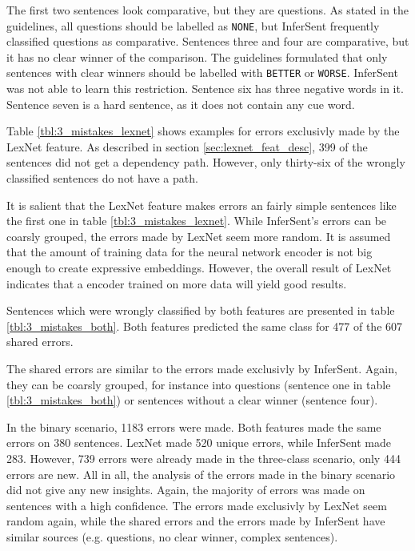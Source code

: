 The first two sentences look comparative, but they are questions. As stated in the guidelines, all questions should be labelled as \texttt{NONE}, but InferSent frequently classified questions as comparative. Sentences three and four are comparative, but it has no clear winner of the comparison. The guidelines formulated that only sentences with clear winners should be labelled with \texttt{BETTER} or \texttt{WORSE}. InferSent was not able to learn this restriction. Sentence six has three negative words in it. Sentence seven is a hard sentence, as it does not contain any cue word.

Table \ref{tbl:3_mistakes_lexnet} shows examples for errors exclusivly made by the LexNet feature. As described in section \ref{sec:lexnet_feat_desc}, 399 of the sentences did not get a dependency path. However, only thirty-six of the wrongly classified sentences do not have a path.

It is salient that the LexNet feature makes errors an fairly simple sentences like the first one in table \ref{tbl:3_mistakes_lexnet}. While InferSent's errors can be coarsly grouped, the errors made by LexNet seem more random. It is assumed that the amount of training data for the neural network encoder is not big enough to create expressive embeddings. However, the overall result of LexNet indicates that a encoder trained on more data will yield good results.

Sentences which were wrongly classified by both features are presented in table \ref{tbl:3_mistakes_both}. Both features predicted the same class for 477 of the 607 shared errors.

The shared errors are similar to the errors made exclusivly by InferSent. Again, they can be coarsly grouped, for instance into questions (sentence one in table \ref{tbl:3_mistakes_both}) or sentences without a clear winner (sentence four).\newline

In the binary scenario, 1183 errors were made. Both features made the same errors on 380 sentences. LexNet made 520 unique errors, while InferSent made 283. However, 739 errors were already made in the three-class scenario, only 444 errors are new. All in all, the analysis of the errors made in the binary scenario did not give any new insights. Again, the majority of errors was made on sentences with a high confidence. The errors made exclusivly by LexNet seem random again, while the shared errors and the errors made by InferSent have similar sources (e.g. questions, no clear winner, complex sentences). %

